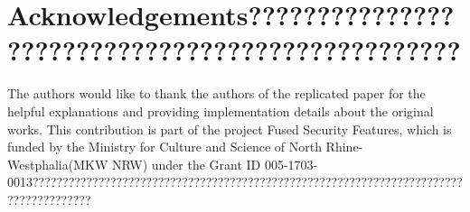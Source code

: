 \section{Acknowledgements????????????????????????????????????????????????}

The authors would like to thank the authors of the replicated paper for the helpful explanations and providing implementation details about the original works. This contribution is part of the project Fused Security Features, which is funded by the Ministry for Culture and Science of North Rhine-Westphalia(MKW NRW) under the Grant ID 005-1703-0013??????????????????????????????????????????????????????????????????????????????????????